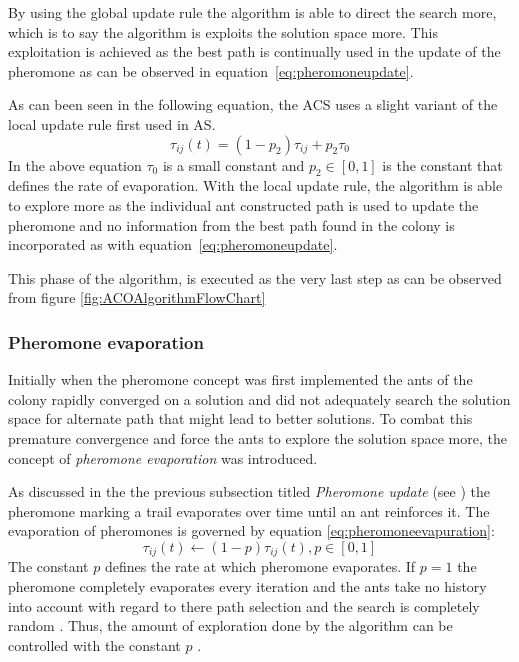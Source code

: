 By using the global update rule the algorithm is able to direct the search more, which is to say the algorithm is exploits the solution space more. This exploitation is achieved as the best path is continually used in the update of the pheromone as can be observed in equation~\ref{eq:pheromoneupdate}\cite{CompuIntelligenceIntro,FundamentalSwarm}.

As can been seen in the following equation, the ACS uses a slight variant of the local update rule first used in AS\cite{CompuIntelligenceIntro}.
\begin{equation}
	\tau_{ij}(t) = (1 - p_2)\tau_{ij} + p_2\tau_0
\end{equation}
In the above equation $\tau_0$ is a small constant and $p_2 \in [0,1]$ is the constant that defines the rate of evaporation\cite{CompuIntelligenceIntro}. With the local update rule, the algorithm is able to explore more as the individual ant constructed path is used to update the pheromone and no information from the best path found in the colony is incorporated as with equation~\ref{eq:pheromoneupdate}\cite{CompuIntelligenceIntro,FundamentalSwarm}.

This phase of the algorithm, is executed as the very last step as can be observed from figure \ref{fig:ACOAlgorithmFlowChart}

\subsubsection{Pheromone evaporation}
\label{sec:pheromoneevapuation}
Initially when the pheromone concept was first implemented the ants of the colony rapidly converged on a solution and did not adequately search the solution space for alternate path that might lead to better solutions. To combat this premature convergence and force the ants to explore the solution space more, the concept of \emph{pheromone evaporation} was introduced\cite{CompuIntelligenceIntro,AntsAndStigmergy,AntIntroTrends,AntSurvey}. 

As discussed in the the previous subsection titled \emph{Pheromone update} (see \pageref{sec:pheromonetrail}) the pheromone marking a trail evaporates over time until an ant reinforces it. The evaporation of pheromones is governed by equation \ref{eq:pheromoneevapuration}\cite{CompuIntelligenceIntro,AntsAndStigmergy,AntIntroTrends,AntSurvey}:
\begin{equation}
\label{eq:pheromoneevapuration}
	\tau_{ij}(t) \leftarrow (1-p)\tau_{ij}(t), p\in [0,1]
\end{equation}
The constant $p$ defines the rate at which pheromone evaporates. If $p=1$ the pheromone completely evaporates every iteration and the ants take no history into account with regard to there path selection and the search is completely random \cite{CompuIntelligenceIntro,AntsAndStigmergy}. Thus, the amount of exploration done by the algorithm can be controlled with the constant $p$ \cite{CompuIntelligenceIntro,AntsAndStigmergy}.

